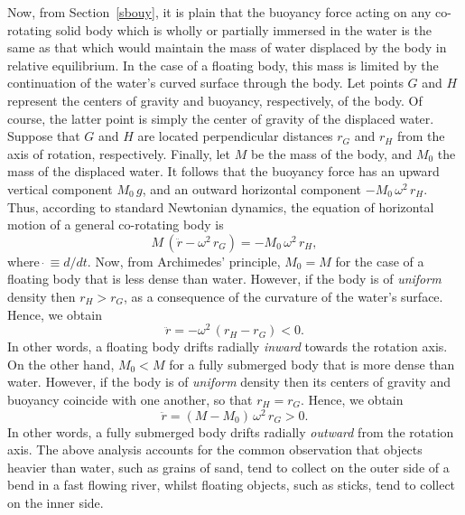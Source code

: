 Now, from Section~\ref{sbouy}, it is plain that the  buoyancy force acting on any co-rotating solid body which is wholly or
partially immersed in the water is the same as that which would maintain the
mass of water displaced by the body in relative equilibrium. In the case of a floating body, this mass is 
limited by the continuation of the water's curved surface through the body. Let points $G$ and
$H$ represent the centers of gravity and  buoyancy, respectively, of the body. Of course, the latter point is
simply the center of gravity of the displaced water. Suppose that $G$ and $H$ are located perpendicular
distances $r_G$ and $r_H$ from the axis of rotation, respectively. Finally, let $M$ be the mass of the body, and
$M_0$ the mass of the displaced water. It follows that the buoyancy force has an upward vertical
component $M_0\,g$, and an outward horizontal component $-M_0\,\omega^2\,r_H$. Thus, according to
standard Newtonian dynamics, the
equation of horizontal motion of a general co-rotating body is
\begin{equation}
M\,(\ddot{r} - \omega^2\,r_G) = -M_0\,\omega^2\,r_H,
\end{equation}
where $\dot{~}\equiv d/dt$. 
Now,  from Archimedes' principle,  $M_0=M$ for the case of a floating body that is less dense than water. 
However, if the body is of {\em uniform}\/ density then $r_H>r_G$, as a consequence of the curvature of the water's surface. Hence,
we obtain
\begin{equation}
\ddot{r} = -\omega^2\,(r_H-r_G) <0.
\end{equation}
In other words,  a  floating body drifts radially {\em inward}\/ towards the rotation axis. On the other hand, $M_0<M$ for a fully submerged
body that is more dense than water. However, if the body is of {\em uniform}\/ density then its centers of
gravity and buoyancy coincide with one another, so that $r_H=r_G$. Hence, we obtain
\begin{equation}
\ddot{r} = (M-M_0)\,\omega^2\,r_G>0.
\end{equation}
In other words, a fully submerged body drifts radially {\em outward}\/ from the rotation axis. The above analysis accounts for the
common observation that objects heavier than water, such as grains of sand, tend to
collect on the outer side of a bend in a fast flowing river, whilst floating objects, such as sticks,
tend to collect on the inner side. 


